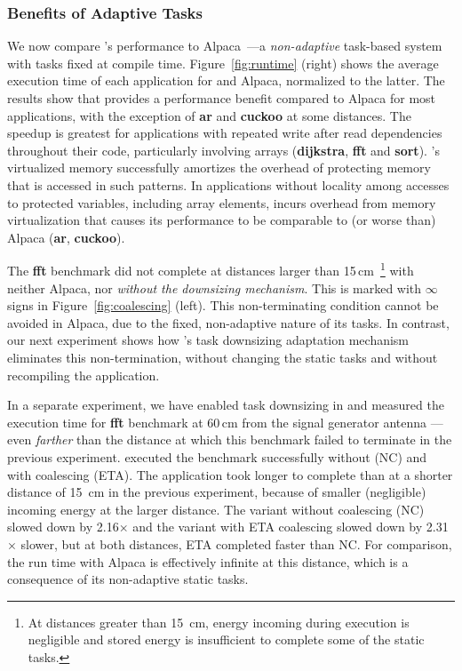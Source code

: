 
\subsubsection{Benefits of Adaptive Tasks}

We now compare \sys's performance to Alpaca~\cite{alpaca}---a
\emph{non-adaptive} task-based system with tasks fixed at compile time.
Figure~\ref{fig:runtime} (right) shows the average execution time of each
application for \sys and Alpaca, normalized to the latter. The results show
that \sys provides a performance benefit compared to Alpaca for most
applications, with the exception of \textbf{ar} and \textbf{cuckoo} at some
distances.  The speedup is greatest for applications with repeated write after
read dependencies throughout their code, particularly involving arrays
(\textbf{dijkstra}, \textbf{fft} and \textbf{sort}). \sys's virtualized memory
successfully amortizes the overhead of protecting memory that is accessed in
such patterns.  In applications without locality among accesses to protected
variables, including array elements, \sys incurs overhead from memory
virtualization that causes its performance to be comparable to (or worse than)
Alpaca (\textbf{ar}, \textbf{cuckoo}).

The \textbf{fft} benchmark did not complete at distances larger than
15\,cm~\footnote{At distances greater than 15~cm, energy incoming during
execution is negligible and stored energy is insufficient to complete some of
the static tasks.} with neither Alpaca, nor \sys \emph{without the downsizing
mechanism}. This is marked with $\infty$ signs in Figure~\ref{fig:coalescing}
(left).  This non-terminating condition cannot be avoided in Alpaca, due to the
fixed, non-adaptive nature of its tasks.  In contrast, our next experiment
shows how \sys's task downsizing adaptation mechanism eliminates this
non-termination, without changing the static tasks and without recompiling the
application.

In a separate experiment, we have enabled task downsizing in \sys and measured
the execution time for \textbf{fft} benchmark at 60\,cm from the signal
generator antenna --- even \emph{farther} than the distance at which this
benchmark failed to terminate in the previous experiment. \sys executed the
benchmark successfully without (NC) and with coalescing (ETA). The application
took longer to complete than at a shorter distance of 15~cm in the previous
experiment, because of smaller (negligible) incoming energy at the larger
distance. The variant without coalescing (NC) slowed down by 2.16$\times$ and the
variant with ETA coalescing slowed down by 2.31$\times$ slower, but at both
distances, ETA completed faster than NC.
%
For comparison, the run time with Alpaca is effectively infinite at this
distance, which is a consequence of its non-adaptive static tasks.


